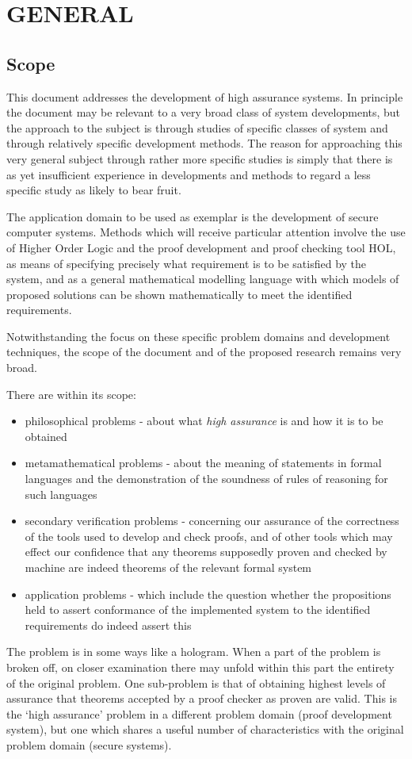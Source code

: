 \section{GENERAL}
\subsection{Scope}

This document addresses the development of high assurance systems.
In principle the document may be relevant to a very broad class of system developments, but the approach  to the subject is through studies of specific classes of system and through relatively specific development methods.
The reason for approaching this very general subject through rather more specific studies is simply that there is as yet insufficient experience in developments and methods to regard a less specific study as likely to bear fruit.

The application domain to be used as exemplar is the development of secure computer systems.
Methods which will receive particular attention involve the use of Higher Order Logic and the proof development and proof checking tool HOL, as means of specifying precisely what requirement is to be satisfied by the system, and as a general mathematical modelling language with which models of proposed solutions can be shown mathematically to meet the identified requirements.

Notwithstanding the focus on these specific problem domains and development techniques, the scope of the document and of the proposed research remains very broad.

There are within its scope:
\begin{itemize}
\item{}
philosophical problems - about what {\em high assurance} is and how it is to be obtained
\item{}
metamathematical problems - about the meaning of statements in formal languages and the demonstration of the soundness of rules of reasoning for such languages
\item{}
secondary verification problems - concerning our assurance of the correctness of the tools used to develop and check proofs, and of other tools which may effect our confidence that any theorems supposedly proven and checked by machine are indeed theorems of the relevant formal system
\item{}
application problems - which include the question whether the propositions held to assert conformance of the implemented system to the identified requirements do indeed assert this
\end{itemize}
The problem is in some ways like a hologram.
When a part of the problem is broken off, on closer examination there may unfold within this part the entirety of the original problem.
One sub-problem is that of obtaining highest levels of assurance that theorems accepted by a proof checker as proven are valid.
This is the `high assurance' problem in a different problem domain (proof development system), but one which shares a useful number of characteristics with the original problem domain (secure systems).
